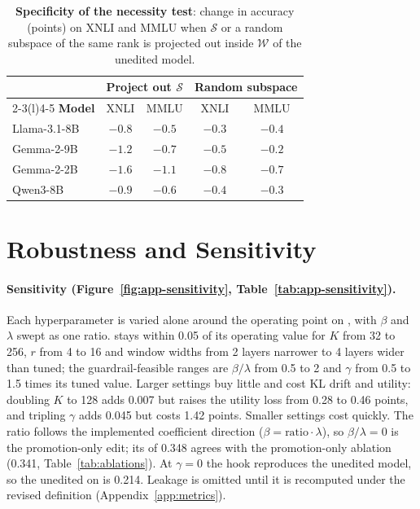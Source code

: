 \begin{table}[!htbp]
  \centering
  \footnotesize
  \setlength{\tabcolsep}{4pt}
  \begin{tabular}{@{}lcccc@{}}
    \toprule
    & \multicolumn{2}{c}{\textbf{Project out $\mathcal{S}$}} & \multicolumn{2}{c}{\textbf{Random subspace}} \\
    \cmidrule(lr){2-3}\cmidrule(l){4-5}
    \textbf{Model} & XNLI & MMLU & XNLI & MMLU \\
    \midrule
    Llama-3.1-8B & $-0.8$ & $-0.5$ & $-0.3$ & $-0.4$ \\
    Gemma-2-9B & $-1.2$ & $-0.7$ & $-0.5$ & $-0.2$ \\
    Gemma-2-2B & $-1.6$ & $-1.1$ & $-0.8$ & $-0.7$ \\
    Qwen3-8B & $-0.9$ & $-0.6$ & $-0.4$ & $-0.3$ \\
    \bottomrule
  \end{tabular}
  \caption{\textbf{Specificity of the necessity test}: change in accuracy (points) on XNLI and MMLU when $\mathcal{S}$ or a random subspace of the same rank is projected out inside $\mathcal{W}$ of the unedited model.}
  \label{tab:app-necessity-spec}
\end{table}

\FloatBarrier
\section{Robustness and Sensitivity}
\label{app:robustness}

\paragraph{Sensitivity (Figure~\ref{fig:app-sensitivity}, Table~\ref{tab:app-sensitivity}).} Each hyperparameter is varied alone around the operating point on \Ddev, with $\beta$ and $\lambda$ swept as one ratio.  stays within 0.05 of its operating value for $K$ from 32 to 256, $r$ from 4 to 16 and window widths from 2 layers narrower to 4 layers wider than tuned; the guardrail-feasible ranges are $\beta/\lambda$ from 0.5 to 2 and $\gamma$ from 0.5 to 1.5 times its tuned value. Larger settings buy little  and cost KL drift and utility: doubling $K$ to 128 adds 0.007  but raises the utility loss from 0.28 to 0.46 points, and tripling $\gamma$ adds 0.045 but costs 1.42 points. Smaller settings cost  quickly. The ratio follows the implemented coefficient direction ($\beta=\text{ratio}\cdot\lambda$), so $\beta/\lambda=0$ is the promotion-only edit; its  of 0.348 agrees with the promotion-only ablation (0.341, Table~\ref{tab:ablations}). At $\gamma=0$ the hook reproduces the unedited model, so the unedited  on \Ddev is 0.214. Leakage is omitted until it is recomputed under the revised definition (Appendix~\ref{app:metrics}).

